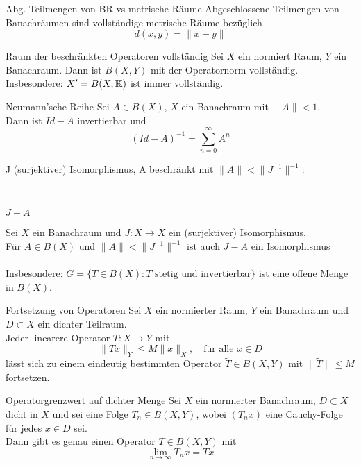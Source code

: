	\begin{karte}{Abg. Teilmengen von BR vs metrische Räume}	
		Abgeschlossene Teilmengen von Banachräumen sind vollständige metrische Räume bezüglich \[ d(x, y) = \| x - y\| \]
	\end{karte}

	\begin{karte}{Raum der beschränkten Operatoren vollständig}		
		Sei $X$ ein normiert Raum, $Y$ ein Banachraum.
	Dann ist $B(X, Y)$ mit der Operatornorm vollständig. \\
	Insbesondere: $X' = B(X, \mathbb{K})$ ist immer  vollständig.
	\end{karte}
	
	\begin{karte}{Neumann'sche Reihe}
		Sei $A \in B(X)$, $X$ ein Banachraum mit $\| A \| < 1$. \\
		Dann ist $Id - A$ invertierbar und 
		\[ \left( Id - A \right)^{-1} = \sum_{n = 0}^{\infty} A^{n} \]
	\end{karte}

	\begin{karte}{J (surjektiver) Isomorphismus, A beschränkt mit $\| A \| < \| J^{-1} \|^{-1}$:
	
		~
		
		 $J - A$}	
		Sei $X$ ein Banachraum und $J: X \rightarrow X$ ein (surjektiver) Isomorphismus. \\
		Für $A \in B(X)$ und $\| A \| < \| J^{-1} \|^{-1}$ ist auch $J - A$ ein Isomorphismus \\ \\
		Insbesondere: $G = \{ T \in B(X): T \text{ stetig und invertierbar} \}$ ist eine offene Menge in $B(X)$.
	\end{karte}	
	
	\begin{karte}{Fortsetzung von Operatoren}
		Sei $X$ ein normierter Raum, $Y$ ein Banachraum und $D \subset X$ ein dichter Teilraum. \\
		Jeder linearere Operator $T: X \rightarrow Y$ mit
		\[ \| T x \|_{Y} \leq M \| x \|_{X}, \quad \text{für alle } x \in D \]
		lässt sich zu einem eindeutig bestimmten Operator $ \tilde T \in B(X, Y)$ mit $\| \tilde T \| \leq M	$ fortsetzen.
	\end{karte}
	
	\begin{karte}{Operatorgrenzwert auf dichter Menge}
		Sei $X$ ein normierter Banachraum, $D \subset X$ dicht in $X$ und sei eine Folge $T_{n} \in B(X, Y)$, wobei $(T_{n} x)$ eine Cauchy-Folge für jedes $x \in D$ sei. \\
		Dann gibt es genau einen Operator $T \in B(X, Y)$ mit
		\[ \lim_{n \rightarrow \infty} T_{n} x = T x \]
	\end{karte}

